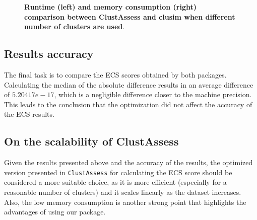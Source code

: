 \begin{figure}[H]
    \centering
    \caption{\label{fig:comp-k}\textbf{Runtime (left) and memory consumption (right) comparison between ClustAssess and clusim when different number of clusters are used}.}
\end{figure}

\subsection{Results accuracy}
The final task is to compare the ECS scores obtained by both packages. Calculating the median of the absolute difference results in an average difference of $5.20417e-17$, which is a negligible difference closer to the machine precision. This leads to the conclusion that the optimization did not affect the accuracy of the ECS results.

\subsection{On the scalability of ClustAssess}
Given the results presented above and the accuracy of the results, the optimized version presented in \verb|ClustAssess| for calculating the ECS score should be considered a more suitable choice, as it is more efficient (especially for a reasonable number of clusters) and it scales linearly as the dataset increases. Also, the low memory consumption is another strong point that highlights the advantages of using our package.

